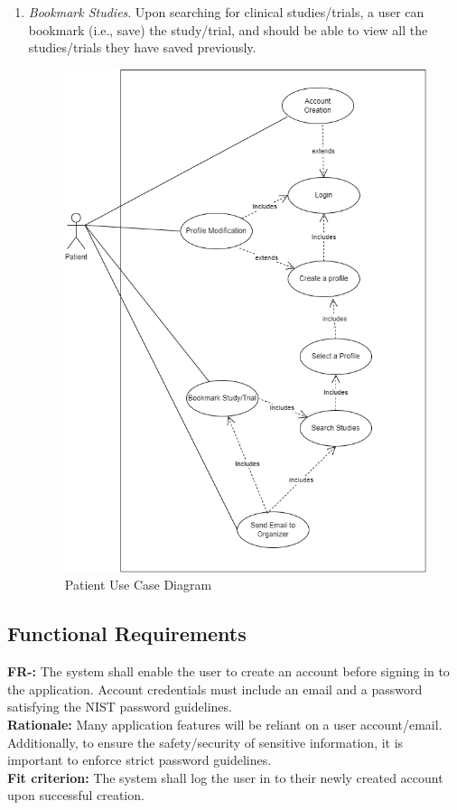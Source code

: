 \documentclass[12pt, titlepage]{article}
\newcounter{FR_Counter}
\begin{document}
\begin{enumerate}
\item \textit{Bookmark Studies}. Upon searching for clinical studies/trials, a user can bookmark (i.e., save) the study/trial, and should be able to view all the studies/trials they have saved previously.


\begin{figure}[H]
\centering
\includegraphics[scale=0.5]{PatientUseCase.png}
\caption{Patient Use Case Diagram}
\end{figure}

\end{enumerate}

\subsection{Functional Requirements}

\textbf{FR-\the\value{FR_Counter}:}
The system shall enable the user to create an account before signing in to the application. Account credentials must include 
an email and a password satisfying the NIST password guidelines.\\
\textbf{Rationale:}
Many application features will be reliant on a user account/email. Additionally, to ensure the safety/security of sensitive information,
it is important to enforce strict password guidelines. \\
\textbf{Fit criterion:}
The system shall log the user in to their newly created account upon successful creation. \\~\\
\addtocounter{FR_Counter}{1}
\end{document}
